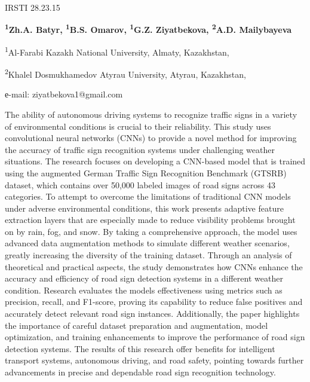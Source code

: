 IRSTI 28.23.15


\begin{center}
{\bfseries \textsuperscript{1}Zh.A. Batyr, \textsuperscript{1}B.S. Omarov,
\textsuperscript{1}G.Z. Ziyatbekova, \textsuperscript{2}A.D.
Mailybayeva}

\textsuperscript{1}Al-Farabi Kazakh National University, Almaty,
Kazakhstan,

\textsuperscript{2}Khalel Dosmukhamedov Atyrau University, Atyrau,
Kazakhstan,

е-mail: ziyatbekova1@gmail.com
\end{center}

The ability of autonomous driving systems to recognize traffic signs in
a variety of environmental conditions is crucial to their reliability.
This study uses convolutional neural networks (CNNs) to provide a novel
method for improving the accuracy of traffic sign recognition systems
under challenging weather situations. The research focuses on developing
a CNN-based model that is trained using the augmented German Traffic
Sign Recognition Benchmark (GTSRB) dataset, which contains over 50,000
labeled images of road signs across 43 categories. To attempt to
overcome the limitations of traditional CNN models under adverse
environmental conditions, this work presents adaptive feature extraction
layers that are especially made to reduce visibility problems brought on
by rain, fog, and snow. By taking a comprehensive approach, the model
uses advanced data augmentation methods to simulate different weather
scenarios, greatly increasing the diversity of the training dataset.
Through an analysis of theoretical and practical aspects, the study
demonstrates how CNNs enhance the accuracy and efficiency of road sign
detection systems in a different weather condition. Research evaluates
the model\textquotesingle s effectiveness using metrics such as
precision, recall, and F1-score, proving its capability to reduce false
positives and accurately detect relevant road sign instances.
Additionally, the paper highlights the importance of careful dataset
preparation and augmentation, model optimization, and training
enhancements to improve the performance of road sign detection systems.
The results of this research offer benefits for intelligent transport
systems, autonomous driving, and road safety, pointing towards further
advancements in precise and dependable road sign recognition technology.

